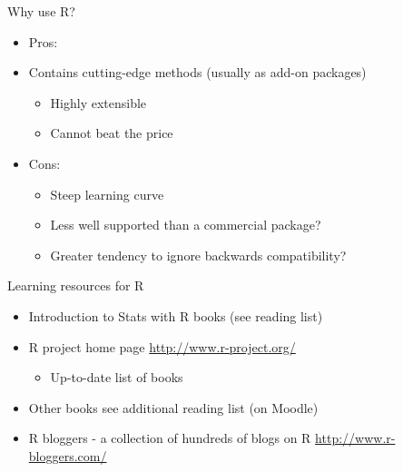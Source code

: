 \documentclass[ignorenonframetext,]{beamer}
\providecommand{\tightlist}{%
  \setlength{\itemsep}{0pt}\setlength{\parskip}{0pt}}
\begin{document}
\begin{frame}{Why use R?}

\begin{itemize}[<+->]
\tightlist
\item
  Pros:
\item
  Contains cutting-edge methods (usually as add-on packages)

  \begin{itemize}[<+->]
  \tightlist
  \item
    Highly extensible
  \item
    Cannot beat the price
  \end{itemize}
\item
  Cons:

  \begin{itemize}[<+->]
  \tightlist
  \item
    Steep learning curve
  \item
    Less well supported than a commercial package?
  \item
    Greater tendency to ignore backwards compatibility?
  \end{itemize}
\end{itemize}

\end{frame}

\begin{frame}{Learning resources for R}

\begin{itemize}[<+->]
\tightlist
\item
  Introduction to Stats with R books (see reading list)
\item
  R project home page \url{http://www.r-project.org/}

  \begin{itemize}[<+->]
  \tightlist
  \item
    Up-to-date list of books
  \end{itemize}
\item
  Other books see additional reading list (on Moodle)
\item
  R bloggers - a collection of hundreds of blogs on R
  \url{http://www.r-bloggers.com/}
\end{itemize}

\end{frame}
\end{document}
